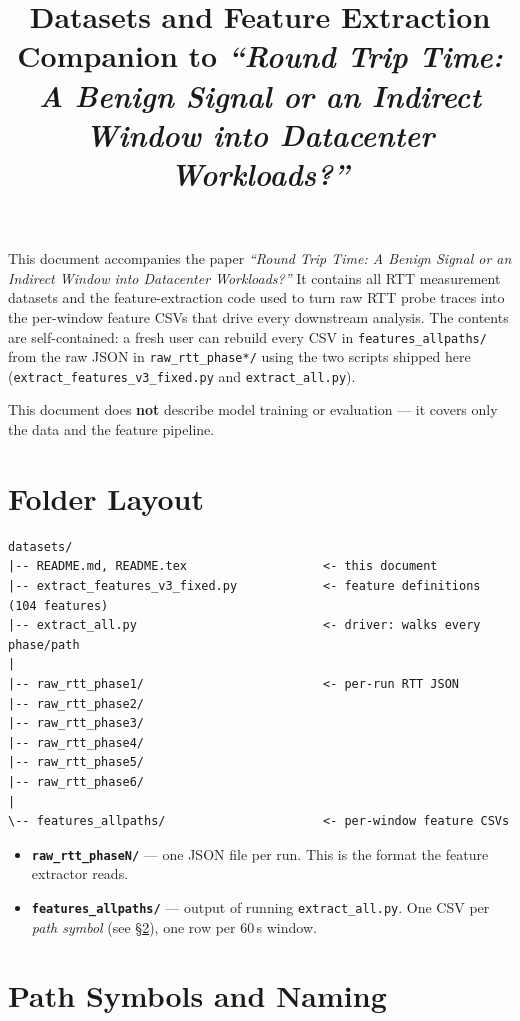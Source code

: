 \documentclass[11pt,a4paper]{article}
\title{Datasets and Feature Extraction\\[4pt]
\large Companion to \emph{``Round Trip Time: A Benign Signal or an Indirect Window into Datacenter Workloads?''}}
\author{}
\date{}
\begin{document}
\maketitle

This document accompanies the paper \emph{``Round Trip Time: A Benign Signal or
an Indirect Window into Datacenter Workloads?''} It contains all RTT
measurement datasets and the feature-extraction code used to turn raw RTT
probe traces into the per-window feature CSVs that drive every downstream
analysis. The contents are self-contained: a fresh user can rebuild every CSV
in \texttt{features\_allpaths/} from the raw JSON in \texttt{raw\_rtt\_phase*/}
using the two scripts shipped here (\texttt{extract\_features\_v3\_fixed.py}
and \texttt{extract\_all.py}).

This document does \textbf{not} describe model training or evaluation --- it
covers only the data and the feature pipeline.

\tableofcontents

\section{Folder Layout}

\begin{lstlisting}
datasets/
|-- README.md, README.tex                   <- this document
|-- extract_features_v3_fixed.py            <- feature definitions (104 features)
|-- extract_all.py                          <- driver: walks every phase/path
|
|-- raw_rtt_phase1/                         <- per-run RTT JSON
|-- raw_rtt_phase2/
|-- raw_rtt_phase3/
|-- raw_rtt_phase4/
|-- raw_rtt_phase5/
|-- raw_rtt_phase6/
|
\-- features_allpaths/                      <- per-window feature CSVs
\end{lstlisting}

\begin{itemize}[leftmargin=*]
  \item \textbf{\texttt{raw\_rtt\_phaseN/}} --- one JSON file per run. This
        is the format the feature extractor reads.
  \item \textbf{\texttt{features\_allpaths/}} --- output of running
        \texttt{extract\_all.py}. One CSV per \emph{path symbol} (see
        \S\ref{sec:paths}), one row per 60\,s window.
\end{itemize}

\section{Path Symbols and Naming}\label{sec:paths}
\end{document}
